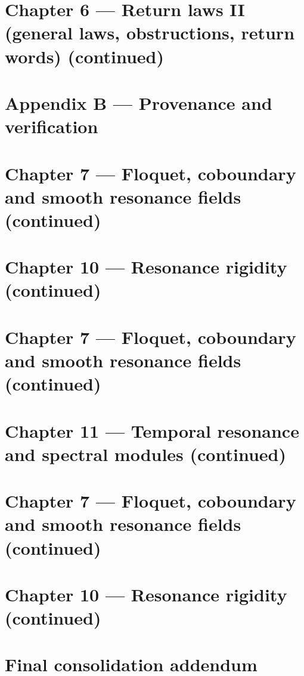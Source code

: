 \documentclass[11pt,a4paper]{article}
\numberwithin{equation}{section}
\begin{document}
\part*{Chapter 6 --- Return laws II (general laws, obstructions, return words) (continued)}

\part*{Appendix B --- Provenance and verification}

\part*{Chapter 7 --- Floquet, coboundary and smooth resonance fields (continued)}


\part*{Chapter 10 --- Resonance rigidity (continued)}

\part*{Chapter 7 --- Floquet, coboundary and smooth resonance fields (continued)}

\part*{Chapter 11 --- Temporal resonance and spectral modules (continued)}

\part*{Chapter 7 --- Floquet, coboundary and smooth resonance fields (continued)}

\part*{Chapter 10 --- Resonance rigidity (continued)}


\part*{Final consolidation addendum}

\end{document}
